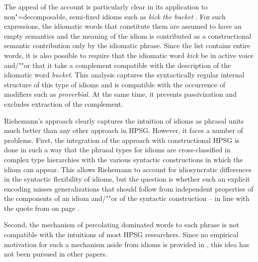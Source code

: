 \documentclass[output=paper
	        ,collection
	        ,collectionchapter
 	        ,biblatex
                ,babelshorthands
                ,newtxmath
                ,draftmode
                ,colorlinks, citecolor=brown
]{langscibook}
\begin{document}
The appeal of the account is particularly clear in its application to non"=de\-com\-posable, semi-fixed idioms such as \emph{kick the bucket} \citep[]{Riehemann2001a}. 
For such expressions, the idiomatic words that constitute them are assumed to have an empty semantics and the meaning of the idiom is contributed as a constructional semantic contribution only by the idiomatic phrase. 
Since the  list contains entire words, it is also possible to require that the idiomatic word \emph{kick} be in active voice and/""or that it take a complement compatible with the description of the idiomatic word \emph{bucket}.
This analysis captures the syntactically regular internal structure of this type of idioms and is compatible with the occurrence of modifiers such as \emph{proverbial}. At the same time, it prevents passivization and excludes extraction of the complement.

Riehemann's approach clearly captures the intuition of idioms as phrasal units much better than any other approach in HPSG. 
However, it faces a number of problems.
First, the integration of the approach with constructional HPSG is done in such a way that the phrasal types for idioms are cross-classified in complex type hierarchies with the various syntactic constructions in which the idiom can appear. 
This allows Riehemann to account for idiosyncratic differences in the syntactic flexibility of idioms, but the question is whether such an explicit encoding misses generalizations that should follow from independent properties of the components of an idiom and/""or of the syntactic construction -- in line with the quote from \citet{NSW94a} on page \pageref{NSW-quote}.


Second, the mechanism of percolating dominated words to each phrase is not compatible with the intuitions of most HPSG researchers. 
Since no empirical motivation for such a mechanism aside from idioms is provided in \citet{Riehemann2001a}, this idea has not been pursued in other papers. 
\end{document}
